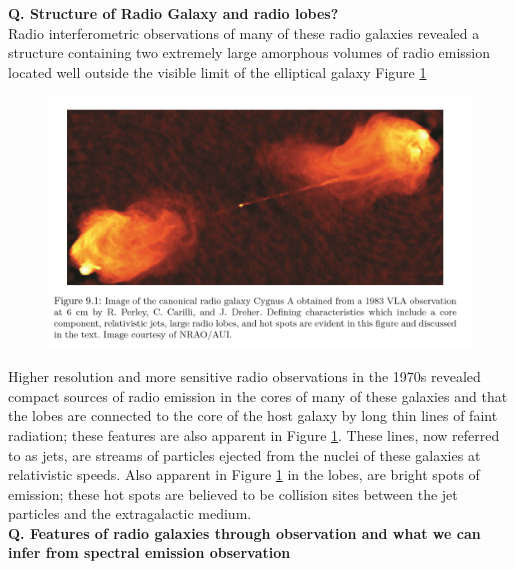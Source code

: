 \documentclass[10pt]{report}
\newcommand{\tbf}[1]{\textbf{#1}}
\begin{document}
 
 \tbf{Q. Structure of Radio Galaxy and radio lobes? }\\
 Radio interferometric observations of many of these radio galaxies revealed a structure containing two extremely large amorphous volumes of radio emission located well outside the visible limit of the elliptical galaxy  Figure \ref{cygnus} 
 \begin{figure}[h!]\label{cygnus}
 \includegraphics[scale=1]{cygnus.png}
 \end{figure}
 Higher resolution and more sensitive radio observations in the 1970s revealed compact sources of radio emission in the cores of many of these galaxies and that the lobes are connected to the core of the host galaxy by long thin lines of faint radiation; these features are also apparent in Figure \ref{cygnus}. These lines, now referred to as jets, are streams of particles ejected from the nuclei of these galaxies at relativistic speeds. Also apparent in Figure \ref{cygnus} in the lobes, are bright spots of emission; these hot spots are believed to be collision sites between the jet particles and the extragalactic medium. \\

\tbf{Q. Features of radio galaxies through observation and what we can infer from spectral emission observation}\\
\end{document}
